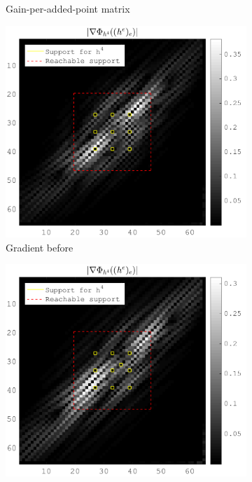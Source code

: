 \begin{figure}[!ht]
\begin{subfigure}[b]{0.32\textwidth}
\caption{Gain-per-added-point matrix} \label{fig_gain_matrix}
\end{subfigure}
\begin{subfigure}[b]{0.32\textwidth}\centering
\includegraphics[width=\textwidth]{figures/before_after/xp_128x128_sc2_angl1_K3_S3_node4before_partgrad4.png}
\caption{Gradient before} \label{fig_grad_before}
\end{subfigure}
\begin{subfigure}[b]{0.32\textwidth}\centering
\includegraphics[width=\textwidth]{figures/before_after/xp_128x128_sc2_angl1_K3_S3_node4after_partgrad4.png}

\end{subfigure}
\end{figure}
